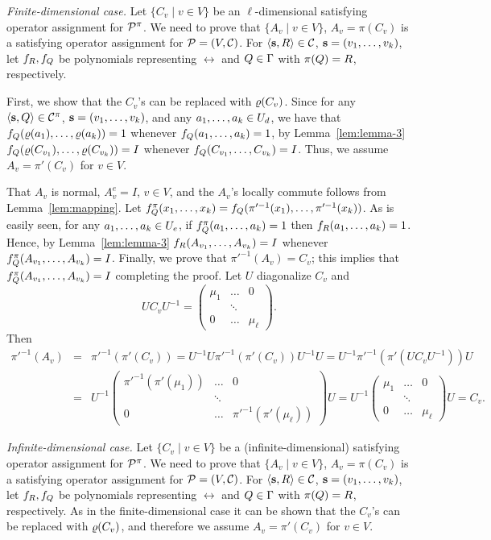 {\it Finite-dimensional case.}
Let $\{C_v\mid v\in V\}$ be an $\ell$-dimensional satisfying operator assignment for ${\mathcal P}^\pi$. We need to prove that $\{A_v\mid v\in V\}$, $A_v=\pi(C_v)$ is a satisfying operator assignment for ${\mathcal P}=(V,{\mathcal C})$. For $\langle {\bf s},R \rangle\in{\mathcal C}$, ${\bf s}=(v _1,\ldots, v _{k})$, let $f_R,f_Q$ be polynomials representing $\rel$ and $Q\in\Gamma$ with $\pi(Q)=R$, respectively. 

First, we show that the $C_v$'s can be replaced with $\varrho(C_v)$. Since for any
$\langle {\bf s},Q \rangle\in{\mathcal C}^\pi$, ${\bf s}=(v _1,\ldots, v _{k})$, and any $a _1,\ldots, a _{k}\in U_d$, we have
that $f_Q(\varrho(a_1),\ldots,\varrho(a_k))=1$ whenever $f_Q(a _1,\ldots, a _{k})=1$, by Lemma~\ref{lem:lemma-3} $f_Q(\varrho(C_{v_1}),\ldots,\varrho(C_{v_k}))=I$ whenever $f_Q(C_{v_1},\ldots, C_{v_k})=I$. Thus, we assume $A_v=\pi'(C_v)$ for $v\in V$.

That $A_v$ is normal, $A_v^e=I$, $v\in V$, and the $A_v$'s locally commute follows from Lemma~\ref{lem:mapping}. Let $f^\pi_Q(x _1,\ldots, x _{k})=f_Q(\pi'^{-1}(x_1),\ldots,\pi'^{-1}(x_k))$. As is easily seen, for any $a _1,\ldots, a _{k}\in U_e$, if $f^\pi_Q(a _1,\ldots, a _{k})=1$ then $f_R(a _1,\ldots, a _{k})=1$. Hence, by Lemma~\ref{lem:lemma-3} $f_R(A_{v_1},\ldots, A_{v_k})=I$ whenever $f^\pi_Q(A_{v_1},\ldots, A_{v_k})=I$. Finally, we prove that $\pi'^{-1}(A_v)=C_v$; this implies that $f^\pi_Q(A_{v_1},\ldots, A_{v_k})=I$ completing the proof. Let $U$ diagonalize $C_v$ and 
\[
UC_vU^{-1}=\left(\begin{array}{ccc}\mu_1&\dots&0\\ &\ddots&\\ 0&\dots&\mu_\ell\end{array}\right).
\]
Then
\begin{eqnarray*}
\pi'^{-1}(A_v) &=& \pi'^{-1}(\pi'(C_v))=U^{-1}U\pi'^{-1}(\pi'(C_v))U^{-1}U=U^{-1}\pi'^{-1}(\pi'(UC_vU^{-1}))U\\
&=& U^{-1}\left(\begin{array}{ccc}\pi'^{-1}(\pi'(\mu_1))&\dots&0\\ &\ddots&\\ 0&\dots&\pi'^{-1}(\pi'(\mu_\ell))\end{array}\right)U
= U^{-1}\left(\begin{array}{ccc}\mu_1&\dots&0\\ &\ddots&\\ 0&\dots&\mu_\ell\end{array}\right)U=C_v.
\end{eqnarray*}

{\it Infinite-dimensional case.}
Let $\{C_v\mid v\in V\}$ be a (infinite-dimensional) satisfying operator assignment for ${\mathcal P}^\pi$. We need to prove that $\{A_v\mid v\in V\}$, $A_v=\pi(C_v)$ is a satisfying operator assignment for ${\mathcal P}=(V,{\mathcal C})$. For $\langle {\bf s},R \rangle\in{\mathcal C}$, ${\bf s}=(v _1,\ldots, v _{k})$, let $f_R,f_Q$ be polynomials representing $\rel$ and $Q\in\Gamma$ with $\pi(Q)=R$, respectively. As in the finite-dimensional case it can be shown that the $C_v$'s can be replaced with $\varrho(C_v)$, and therefore we assume $A_v=\pi'(C_v)$ for $v\in V$.

